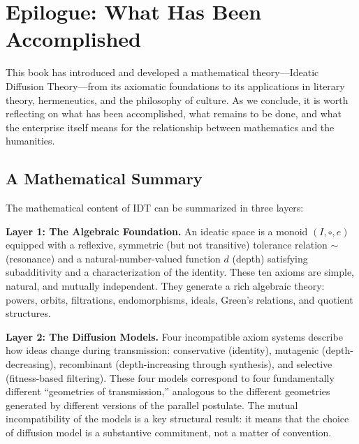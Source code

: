 \documentclass[11pt,openany]{book}
\theoremstyle{definition}
\theoremstyle{plain}
\theoremstyle{remark}
\begin{document}
\chapter*{Epilogue: What Has Been Accomplished}

This book has introduced and developed a mathematical theory---Ideatic Diffusion Theory---from its axiomatic foundations to its applications in literary theory, hermeneutics, and the philosophy of culture. As we conclude, it is worth reflecting on what has been accomplished, what remains to be done, and what the enterprise itself means for the relationship between mathematics and the humanities.

\section*{A Mathematical Summary}

The mathematical content of IDT can be summarized in three layers:

\textbf{Layer 1: The Algebraic Foundation.} An ideatic space is a monoid $(I, \circ, e)$ equipped with a reflexive, symmetric (but not transitive) tolerance relation $\sim$ (resonance) and a natural-number-valued function $d$ (depth) satisfying subadditivity and a characterization of the identity. These ten axioms are simple, natural, and mutually independent. They generate a rich algebraic theory: powers, orbits, filtrations, endomorphisms, ideals, Green's relations, and quotient structures.

\textbf{Layer 2: The Diffusion Models.} Four incompatible axiom systems describe how ideas change during transmission: conservative (identity), mutagenic (depth-decreasing), recombinant (depth-increasing through synthesis), and selective (fitness-based filtering). These four models correspond to four fundamentally different ``geometries of transmission,'' analogous to the different geometries generated by different versions of the parallel postulate. The mutual incompatibility of the models is a key structural result: it means that the choice of diffusion model is a substantive commitment, not a matter of convention.
\end{document}
